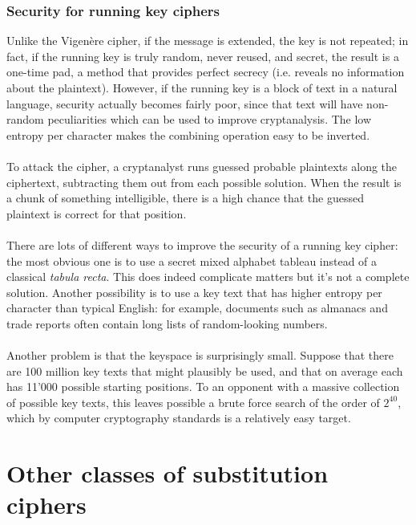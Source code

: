 \documentclass[Lau,binding=0.6cm,oneside]{sapthesis}
\begin{document}
\subsection{Security for running key ciphers}
Unlike the Vigenère cipher, if the message is extended, the key is not repeated; in fact, if the running key is truly random, never reused, and secret, the result is a one-time pad, a method that provides perfect secrecy (i.e. reveals no information about the plaintext). However, if the running key is a block of text in a natural language, security actually becomes fairly poor, since that text will have non-random peculiarities which can be used to improve cryptanalysis. The low entropy per character makes the combining operation easy to be inverted.\\\\
To attack the cipher, a cryptanalyst runs guessed probable plaintexts along the ciphertext, subtracting them out from each possible solution. When the result is a chunk of something intelligible, there is a high chance that the guessed plaintext is correct for that position.\\\\
There are lots of different ways to improve the security of a running key cipher: the most obvious one is to use a secret mixed alphabet tableau instead of a classical \textit{tabula recta}. This does indeed complicate matters but it's not a complete solution. Another possibility is to use a key text that has higher entropy per character than typical English: for example, documents such as almanacs and trade reports often contain long lists of random-looking numbers.\\\\
Another problem is that the keyspace is surprisingly small. Suppose that there are 100 million key texts that might plausibly be used, and that on average each has 11'000 possible starting positions. To an opponent with a massive collection of possible key texts, this leaves possible a brute force search of the order of $2^{40}$, which by computer cryptography standards is a relatively easy target.

\chapter{Other classes of substitution ciphers}
\end{document}
